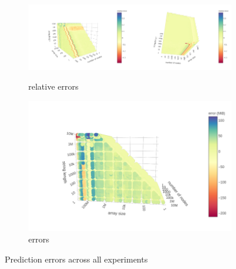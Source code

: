 \documentclass{article}
\begin{document}
\begin{figure}
  \centering
  \begin{subfigure}[t]{\textwidth}
    \centering
    \includegraphics[width=0.5\textwidth]{../io_memory_tests/plots/prediction_relative1.png}\includegraphics[width=0.5\textwidth]{../io_memory_tests/plots/prediction_relative2.png}
    \caption{relative errors}
  \end{subfigure}
  \begin{subfigure}[t]{0.49\textwidth}
    \centering
    \includegraphics[width=\textwidth]{../io_memory_tests/plots/prediction_errors.png}
    \caption{errors}
    \label{fig:prediction_error_b}
  \end{subfigure}
  \caption{Prediction errors across all experiments}
  \label{fig:prediction_errors}
\end{figure}
\end{document}
